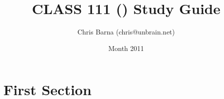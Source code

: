 \documentclass{article}
\begin{document}
\title{CLASS 111 () Study Guide}
\author{Chris Barna (chris@unbrain.net)}
\date{Month 2011}

\maketitle

\section{First Section}
\end{document}
